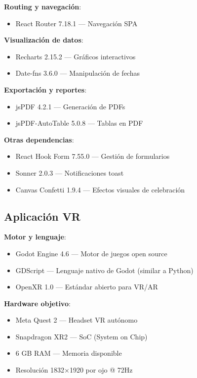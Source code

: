 \textbf{Routing y navegación}:
\begin{itemize}
    \item React Router 7.18.1 — Navegación SPA
\end{itemize}

\textbf{Visualización de datos}:
\begin{itemize}
    \item Recharts 2.15.2 — Gráficos interactivos
    \item Date-fns 3.6.0 — Manipulación de fechas
\end{itemize}

\textbf{Exportación y reportes}:
\begin{itemize}
    \item jsPDF 4.2.1 — Generación de PDFs
    \item jsPDF-AutoTable 5.0.8 — Tablas en PDF
\end{itemize}

\textbf{Otras dependencias}:
\begin{itemize}
    \item React Hook Form 7.55.0 — Gestión de formularios
    \item Sonner 2.0.3 — Notificaciones toast
    \item Canvas Confetti 1.9.4 — Efectos visuales de celebración
\end{itemize}

\subsection{Aplicación VR}

\textbf{Motor y lenguaje}:
\begin{itemize}
    \item Godot Engine 4.6 — Motor de juegos open source
    \item GDScript — Lenguaje nativo de Godot (similar a Python)
    \item OpenXR 1.0 — Estándar abierto para VR/AR
\end{itemize}

\textbf{Hardware objetivo}:
\begin{itemize}
    \item Meta Quest 2 — Headset VR autónomo
    \item Snapdragon XR2 — SoC (System on Chip)
    \item 6 GB RAM — Memoria disponible
    \item Resolución 1832×1920 por ojo @ 72Hz
\end{itemize}

